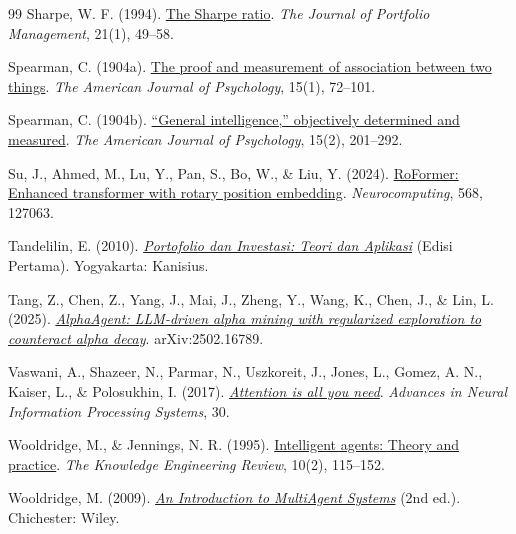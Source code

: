 \begin{thebibliography}{99}
Sharpe, W. F. (1994).
\href{https://doi.org/10.3905/jpm.1994.409501}{The Sharpe ratio}.
\emph{The Journal of Portfolio Management}, 21(1), 49--58.

Spearman, C. (1904a).
\href{https://doi.org/10.2307/1412159}{The proof and measurement of
association between two things}. \emph{The American Journal of Psychology},
15(1), 72--101.

Spearman, C. (1904b).
\href{https://doi.org/10.2307/1412107}{``General intelligence,'' objectively
determined and measured}. \emph{The American Journal of Psychology}, 15(2),
201--292.

Su, J., Ahmed, M., Lu, Y., Pan, S., Bo, W., \& Liu, Y. (2024).
\href{https://arxiv.org/abs/2104.09864}{RoFormer: Enhanced transformer with
rotary position embedding}. \emph{Neurocomputing}, 568, 127063.

Tandelilin, E. (2010).
\href{https://openlibrary.telkomuniversity.ac.id/pustaka/155750/portofolio-dan-investasi-teori-dan-aplikasi.html}{\emph{Portofolio
dan Investasi: Teori dan Aplikasi}} (Edisi Pertama). Yogyakarta: Kanisius.

Tang, Z., Chen, Z., Yang, J., Mai, J., Zheng, Y., Wang, K., Chen, J., \& Lin, L.
(2025).
\href{https://arxiv.org/abs/2502.16789}{\emph{AlphaAgent: LLM-driven alpha
mining with regularized exploration to counteract alpha decay}}.
arXiv:2502.16789.

Vaswani, A., Shazeer, N., Parmar, N., Uszkoreit, J., Jones, L., Gomez, A. N.,
Kaiser, L., \& Polosukhin, I. (2017).
\href{https://arxiv.org/abs/1706.03762}{\emph{Attention is all you need}}.
\emph{Advances in Neural Information Processing Systems}, 30.

Wooldridge, M., \& Jennings, N. R. (1995).
\href{https://doi.org/10.1017/S0269888900008122}{Intelligent agents: Theory and
practice}. \emph{The Knowledge Engineering Review}, 10(2), 115--152.

Wooldridge, M. (2009).
\href{https://archive.org/details/introductiontomu0000wool}{\emph{An
Introduction to MultiAgent Systems}} (2nd ed.). Chichester: Wiley.


\end{thebibliography}
